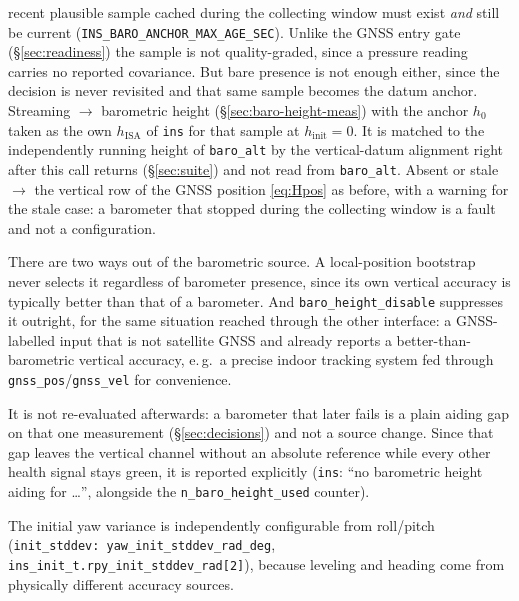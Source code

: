 \documentclass[11pt,a4paper]{article}
\newcommand{\code}[1]{\texttt{#1}}
\begin{document}
\begin{itemize}
        recent plausible sample cached during the collecting window must exist
        \emph{and} still be current (\code{INS\_\allowbreak{}BARO\_\allowbreak{}ANCHOR\_\allowbreak{}MAX\_\allowbreak{}AGE\_\allowbreak{}SEC}).
        Unlike the GNSS entry gate (\S\ref{sec:readiness}) the sample is not
        quality-graded, since a pressure reading carries no reported covariance.
        But bare presence is not enough either, since the decision is never
        revisited and that same sample becomes the datum anchor. Streaming
        $\rightarrow$ barometric height (\S\ref{sec:baro-height-meas}) with the
        anchor $h_0$ taken as the own $h_{\text{ISA}}$ of \code{ins} for that sample
        at $h_{\text{init}} = 0$. It is matched to the independently running
        height of \code{baro\_\allowbreak{}alt} by the vertical-datum alignment
        right after this call returns (\S\ref{sec:suite}) and not read from
        \code{baro\_\allowbreak{}alt}. Absent or stale $\rightarrow$ the vertical row of the
        GNSS position \eqref{eq:Hpos} as before, with a warning for the stale
        case: a barometer that stopped during the collecting window is a fault
        and not a configuration.

        There are two ways out of the barometric source. A local-position bootstrap
        never selects it regardless of barometer presence, since its own vertical
        accuracy is typically better than that of a barometer. And
        \code{baro\_\allowbreak{}height\_\allowbreak{}disable} suppresses it outright, for the same
        situation reached through the other interface: a GNSS-labelled input
        that is not satellite GNSS and already reports a better-than-barometric
        vertical accuracy, e.\,g.\ a precise indoor tracking system fed through
        \code{gnss\_\allowbreak{}pos}/\code{gnss\_\allowbreak{}vel} for convenience.

        It is not re-evaluated afterwards: a barometer that later fails is a plain
        aiding gap on that one measurement (\S\ref{sec:decisions}) and not a
        source change. Since that gap leaves the vertical channel without an
        absolute reference while every other health signal stays green, it is
        reported explicitly (\code{ins}: ``no barometric height aiding for
        \dots'', alongside the \code{n\_\allowbreak{}baro\_\allowbreak{}height\_\allowbreak{}used} counter).
\end{itemize}
The initial yaw variance is independently configurable from roll/pitch
(\code{init\_\allowbreak{}stddev: yaw\_\allowbreak{}init\_\allowbreak{}stddev\_\allowbreak{}rad\_\allowbreak{}deg},
\code{ins\_\allowbreak{}init\_\allowbreak{}t.rpy\_\allowbreak{}init\_\allowbreak{}stddev\_\allowbreak{}rad[2]}), because leveling and heading come
from physically different accuracy sources.
\end{document}
